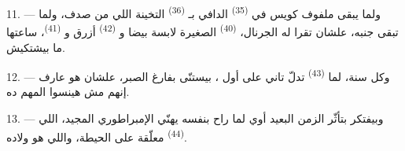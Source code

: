 11. --- ولما يبقى ملفوف كويس في  \textsuperscript{(35)} الدافي
بـ \textsuperscript{(36)} التخينة اللي من صدف، ولما تبقى جنبه، علشان تقرا
له الجرنال،  \textsuperscript{(40)} الصغيرة لابسة  بيضا
و \textsuperscript{(42)} أزرق و \textsuperscript{(41)}، ساعتها ما
بيشتكيش.

12. --- وكل سنة، لما  \textsuperscript{(43)} تدلّ تاني على
 أول ، بيستنّى  بفارغ الصبر، علشان
هو عارف إنهم مش هينسوا  المهم ده.

13. --- وبيفتكر بتأثّر الزمن البعيد أوي لما راح بنفسه يهنّي 
الإمبراطوري المجيد، اللي  \textsuperscript{(44)} معلّقة على الحيطة، واللي
هو  ولاده.

\VUsaut{6.0mm}
\VUfilet{22mm}
